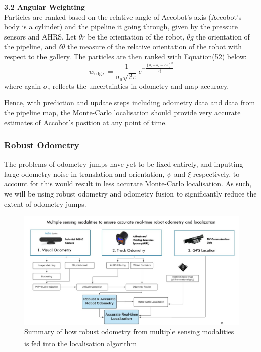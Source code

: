 \documentclass[11pt]{article}		%
\newcommand{\supercite}[1]{\textsuperscript{\cite{#1}}}		%
\begin{document}
    \textbf{3.2 Angular Weighting}
    \\Particles are ranked based on the relative angle of Accobot's axis (Accobot's body is a cylinder) and the pipeline it going through, given by the pressure sensors and AHRS. Let $\theta r$ be the orientation of the robot, $\theta g$ the orientation of the pipeline, and $\delta \theta$ the measure of the relative orientation of the robot with respect to the gallery. The particles are then ranked with Equation(52) below:
    \begin{equation}
w_{\text {edge }}=\frac{1}{\sigma_{a} \sqrt{2 \pi}} e^{-\frac{\left(\theta_{r}-\theta_{g}-\Delta \theta\right)^{2}}{\sigma_{a}^{2}}}
\end{equation}
	 where again $\sigma_e$ reflects the uncertainties in odometry and map accuracy.
	 
	 Hence, with prediction and update steps including odometry data and data from the pipeline map, the Monte-Carlo localisation should provide very accurate estimates of Accobot's position at any point of time.
	 
	\subsubsection{Robust Odometry}
	The problems of odometry jumps have yet to be fixed entirely, and inputting large odometry noise in translation and orientation, $\psi$ and $\xi$ respectively, to account for this would result in less accurate Monte-Carlo localisation. As such, we will be using robust odometry and odometry fusion to significantly reduce the extent of odometry jumps. 
	
										\begin{figure}[h]
				\centering
				\includegraphics[width=\textwidth]{robustodometry.jpg}
				\caption{Summary of how robust odometry from multiple sensing modalities is fed into the localisation algorithm\supercite{ELFTransmitter}}
				\label{localisationChart}
			\end{figure}
			
\end{document}
